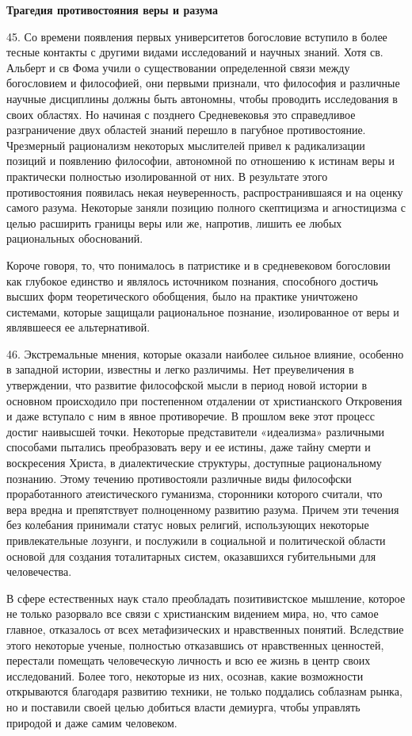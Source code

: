 \documentclass[a5paper,10pt]{article}
\begin{document}
\textbf{Трагедия противостояния веры и разума}

45. Со времени появления первых университетов богословие вступило в более
тесные контакты с другими видами исследований и научных знаний. Хотя св.
Альберт и св Фома учили о существовании определенной связи между богословием и
философией, они первыми признали, что философия и различные научные дисциплины
должны быть автономны, чтобы проводить исследования в своих областях. Но
начиная с позднего Средневековья это справедливое разграничение двух областей
знаний перешло в пагубное противостояние.  Чрезмерный рационализм некоторых
мыслителей привел к радикализации позиций и появлению философии, автономной по
отношению к истинам веры и практически полностью изолированной от них. В
результате этого противостояния появилась некая неуверенность,
распространившаяся и на оценку самого разума. Некоторые заняли позицию полного
скептицизма и агностицизма с целью расширить границы веры или же, напротив,
лишить ее любых рациональных обоснований.

Короче говоря, то, что понималось в патристике и в средневековом богословии как
глубокое единство и являлось источником познания, способного достичь высших
форм теоретического обобщения, было на практике уничтожено системами, которые
защищали рациональное познание, изолированное от веры и являвшееся ее
альтернативой.

46. Экстремальные мнения, которые оказали наиболее сильное влияние, особенно в
западной истории, известны и легко различимы. Нет преувеличения в утверждении,
что развитие философской мысли в период новой истории в основном происходило
при постепенном отдалении от христианского Откровения и даже вступало с ним в
явное противоречие. В прошлом веке этот процесс достиг наивысшей точки.
Некоторые представители «идеализма» различными способами пытались преобразовать
веру и ее истины, даже тайну смерти и воскресения Христа, в диалектические
структуры, доступные рациональному познанию. Этому течению противостояли
различные виды философски проработанного атеистического гуманизма, сторонники
которого считали, что вера вредна и препятствует полноценному развитию разума.
Причем эти течения без колебания принимали статус новых религий, использующих
некоторые привлекательные лозунги, и послужили в социальной и политической
области основой для создания тоталитарных систем, оказавшихся губительными для
человечества.

В сфере естественных наук стало преобладать позитивистское мышление, которое не
только разорвало все связи с христианским видением мира, но, что самое главное,
отказалось от всех метафизических и нравственных понятий. Вследствие этого
некоторые ученые, полностью отказавшись от нравственных ценностей, перестали
помещать человеческую личность и всю ее жизнь в центр своих исследований. Более
того, некоторые из них, осознав, какие возможности открываются благодаря
развитию техники, не только поддались соблазнам рынка, но и поставили своей
целью добиться власти демиурга, чтобы управлять природой и даже самим
человеком.
\end{document}
